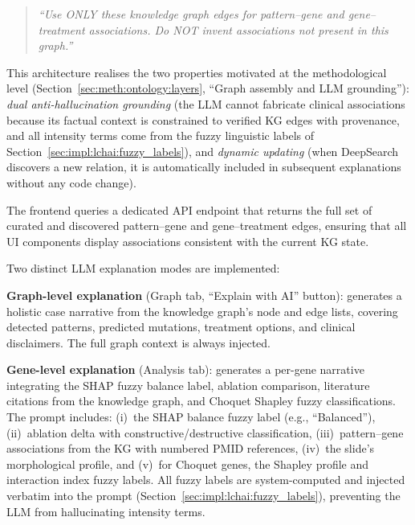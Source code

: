 \begin{quote}
\emph{``Use ONLY these knowledge graph edges for pattern--gene and
gene--treatment associations.
Do NOT invent associations not present in this graph.''}
\end{quote}

This architecture realises the two properties motivated at the
methodological level (Section~\ref{sec:meth:ontology:layers},
``Graph assembly and LLM grounding''):
\emph{dual anti-hallucination grounding} (the LLM cannot fabricate
clinical associations because its factual context is constrained to
verified KG edges with provenance, and all intensity terms come from
the fuzzy linguistic labels of
Section~\ref{sec:impl:lchai:fuzzy_labels}), and
\emph{dynamic updating} (when DeepSearch discovers a new relation,
it is automatically included in subsequent explanations without any
code change).

The frontend queries a dedicated API endpoint that returns the full
set of curated and discovered pattern--gene and gene--treatment edges,
ensuring that all UI components display associations consistent with
the current KG state.

Two distinct LLM explanation modes are implemented:

\textbf{Graph-level explanation} (Graph tab, ``Explain with AI'' button):
generates a holistic case narrative from the knowledge graph's node and
edge lists, covering detected patterns, predicted mutations, treatment
options, and clinical disclaimers.
The full graph context is always injected.

\textbf{Gene-level explanation} (Analysis tab):
generates a per-gene narrative integrating the SHAP fuzzy balance
label, ablation comparison, literature citations from the knowledge
graph, and Choquet Shapley fuzzy classifications.
The prompt includes:
(i)~the SHAP balance fuzzy label (e.g., ``Balanced''),
(ii)~ablation delta with constructive/destructive classification,
(iii)~pattern--gene associations from the KG with numbered PMID
references,
(iv)~the slide's morphological profile, and
(v)~for Choquet genes, the Shapley profile and interaction index
fuzzy labels.
All fuzzy labels are system-computed and injected verbatim into the
prompt (Section~\ref{sec:impl:lchai:fuzzy_labels}), preventing the
LLM from hallucinating intensity terms.

